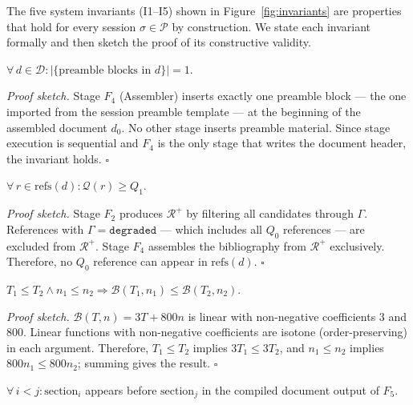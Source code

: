 The five system invariants (I1--I5) shown in Figure~\ref{fig:invariants} are properties
that hold for every session $\sigma\in\mathcal{P}$ by construction.
We state each invariant formally and then sketch the proof of its constructive validity.



\begin{invariant}
\label{inv:preamble}
$\forall\,d\in\mathcal{D}: |\{\text{preamble blocks in }d\}|=1$.
\end{invariant}

\noindent\textit{Proof sketch.}
Stage $F_4$ (Assembler) inserts exactly one preamble block — the one imported from
the session preamble template — at the beginning of the assembled document $d_0$.
No other stage inserts preamble material.
Since stage execution is sequential and $F_4$ is the only stage that writes the
document header, the invariant holds. \hfill$\square$

\begin{invariant}
\label{inv:citation}
$\forall\,r\in\mathrm{refs}(d): \mathcal{Q}(r)\geq Q_1$.
\end{invariant}

\noindent\textit{Proof sketch.}
Stage $F_2$ produces $\mathcal{R}^+$ by filtering all candidates through $\Gamma$.
References with $\Gamma=\texttt{degraded}$ — which includes all $Q_0$ references — are
excluded from $\mathcal{R}^+$.
Stage $F_4$ assembles the bibliography from $\mathcal{R}^+$ exclusively.
Therefore, no $Q_0$ reference can appear in $\mathrm{refs}(d)$. \hfill$\square$

\begin{invariant}
\label{inv:billing}
$T_1\leq T_2\wedge n_1\leq n_2\Rightarrow\mathcal{B}(T_1,n_1)\leq\mathcal{B}(T_2,n_2)$.
\end{invariant}

\noindent\textit{Proof sketch.}
$\mathcal{B}(T,n)=3T+800n$ is linear with non-negative coefficients $3$ and $800$.
Linear functions with non-negative coefficients are isotone (order-preserving) in
each argument.
Therefore, $T_1\leq T_2$ implies $3T_1\leq 3T_2$, and $n_1\leq n_2$ implies
$800n_1\leq 800n_2$; summing gives the result. \hfill$\square$

\begin{invariant}
\label{inv:order}
$\forall\,i<j: \mathrm{section}_i$ appears before $\mathrm{section}_j$ in the
compiled document output of $F_5$.
\end{invariant}

